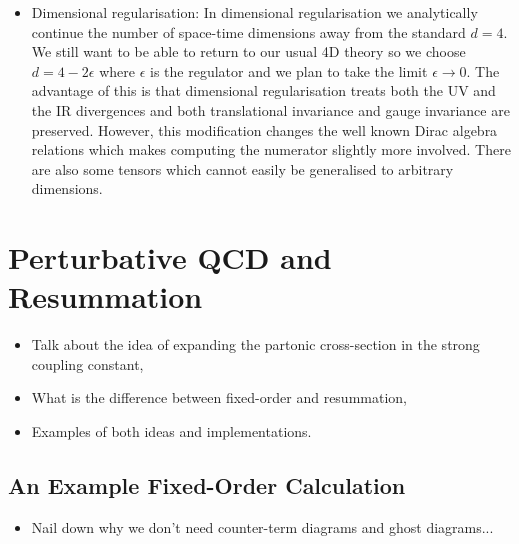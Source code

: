 \begin{itemize}
		\item Dimensional regularisation:  In dimensional regularisation we analytically continue the number of space-time
		dimensions away from the standard $d=4$.  We still want to be able to return to our usual 4D theory so we choose
		$d=4-2\epsilon$ where $\epsilon$ is the regulator and we plan to take the limit $\epsilon\rightarrow 0$.  The
		advantage of this is that dimensional regularisation treats both the UV and the IR divergences and both translational
		invariance and gauge invariance are preserved.  However, this modification changes the well known Dirac algebra
		relations which makes computing the numerator slightly more involved.  There are also some tensors which cannot
		easily be generalised to arbitrary dimensions.
	\end{itemize}

\section{Perturbative QCD and Resummation}

	{\color{red}
	\begin{itemize}
		\item Talk about the idea of expanding the partonic cross-section in the strong coupling constant,
		\item What is the difference between fixed-order and resummation,
		\item Examples of both ideas and implementations.
	\end{itemize}
	}

	\subsection{An Example Fixed-Order Calculation}

	{\color{red}
	\begin{itemize}
		\item Nail down why we don't need counter-term diagrams and ghost diagrams...
	\end{itemize}
	}

